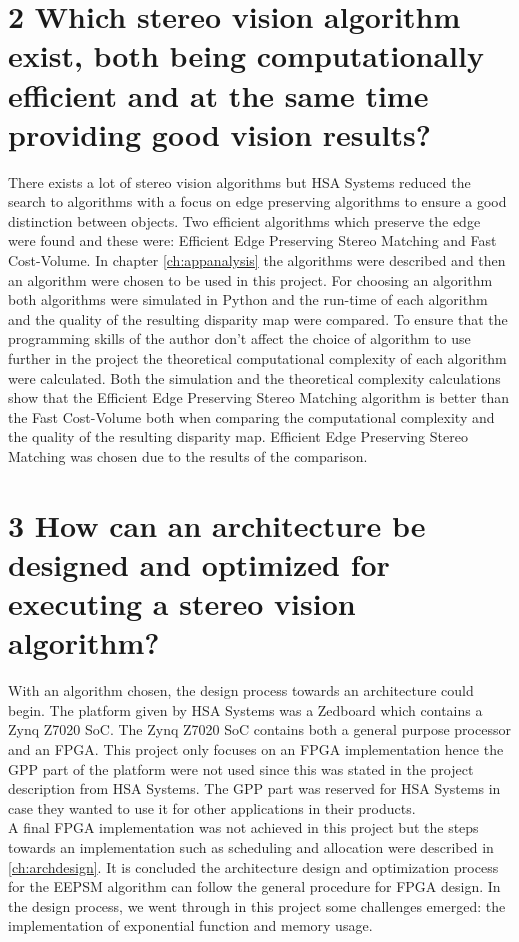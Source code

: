 \section*{2 Which stereo vision algorithm exist, both being computationally efficient and at the same time providing good vision results?}
There exists a lot of stereo vision algorithms but HSA Systems reduced the search to algorithms with a focus on edge preserving algorithms to ensure a good distinction between objects. Two efficient algorithms which preserve the edge were found and these were: Efficient Edge Preserving Stereo Matching and Fast Cost-Volume. In chapter \ref{ch:appanalysis} the algorithms were described and then an algorithm were chosen to be used in this project. For choosing an algorithm both algorithms were simulated in Python and the run-time of each algorithm and the quality of the resulting disparity map were compared. To ensure that the programming skills of the author don't affect the choice of algorithm to use further in the project the theoretical computational complexity of each algorithm were calculated. Both the simulation and the theoretical complexity calculations show that the Efficient Edge Preserving Stereo Matching algorithm is better than the Fast Cost-Volume both when comparing the computational complexity and the quality of the resulting disparity map. Efficient Edge Preserving Stereo Matching was chosen due to the results of the comparison.

\section*{3 How can an architecture be designed and optimized for executing a stereo vision algorithm?}
With an algorithm chosen, the design process towards an architecture could begin. The platform given by HSA Systems was a Zedboard which contains a Zynq Z7020 SoC. The Zynq Z7020 SoC contains both a general purpose processor and an FPGA. This project only focuses on an FPGA implementation hence the GPP part of the platform were not used since this was stated in the project description from HSA Systems. The GPP part was reserved for HSA Systems in case they wanted to use it for other applications in their products.\\

A final FPGA implementation was not achieved in this project but the steps towards an implementation such as scheduling and allocation were described in \ref{ch:archdesign}. It is concluded the architecture design and optimization process for the EEPSM algorithm can follow the general procedure for FPGA design. In the design process, we went through in this project some challenges emerged: the implementation of exponential function and memory usage.\\

